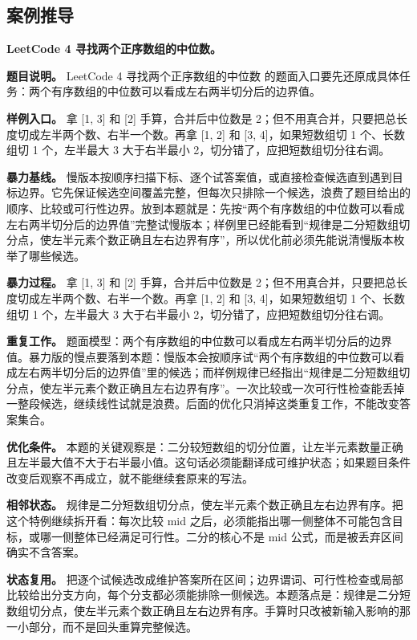 \subsection{案例推导}

\noindent\textbf{LeetCode 4 寻找两个正序数组的中位数。}

\textbf{题目说明。} LeetCode 4 寻找两个正序数组的中位数 的题面入口要先还原成具体任务：两个有序数组的中位数可以看成左右两半切分后的边界值。

\textbf{样例入口。} 拿 [1, 3] 和 [2] 手算，合并后中位数是 2；但不用真合并，只要把总长度切成左半两个数、右半一个数。再拿 [1, 2] 和 [3, 4]，如果短数组切 1 个、长数组切 1 个，左半最大 3 大于右半最小 2，切分错了，应把短数组切分往右调。

\textbf{暴力基线。} 慢版本按顺序扫描下标、逐个试答案值，或直接检查候选直到遇到目标边界。它先保证候选空间覆盖完整，但每次只排除一个候选，浪费了题目给出的顺序、比较或可行性边界。放到本题就是：先按“两个有序数组的中位数可以看成左右两半切分后的边界值”完整试慢版本；样例里已经能看到“规律是二分短数组切分点，使左半元素个数正确且左右边界有序”，所以优化前必须先能说清慢版本枚举了哪些候选。

\textbf{暴力过程。} 拿 [1, 3] 和 [2] 手算，合并后中位数是 2；但不用真合并，只要把总长度切成左半两个数、右半一个数。再拿 [1, 2] 和 [3, 4]，如果短数组切 1 个、长数组切 1 个，左半最大 3 大于右半最小 2，切分错了，应把短数组切分往右调。

\textbf{重复工作。} 题面模型：两个有序数组的中位数可以看成左右两半切分后的边界值。暴力版的慢点要落到本题：慢版本会按顺序试“两个有序数组的中位数可以看成左右两半切分后的边界值”里的候选；而样例规律已经指出“规律是二分短数组切分点，使左半元素个数正确且左右边界有序”。一次比较或一次可行性检查能丢掉一整段候选，继续线性试就是浪费。后面的优化只消掉这类重复工作，不能改变答案集合。

\textbf{优化条件。} 本题的关键观察是：二分较短数组的切分位置，让左半元素数量正确且左半最大值不大于右半最小值。这句话必须能翻译成可维护状态；如果题目条件改变后观察不再成立，就不能继续套原来的写法。

\textbf{相邻状态。} 规律是二分短数组切分点，使左半元素个数正确且左右边界有序。把这个特例继续拆开看：每次比较 mid 之后，必须能指出哪一侧整体不可能包含目标，或哪一侧整体已经满足可行性。二分的核心不是 mid 公式，而是被丢弃区间确实不含答案。

\textbf{状态复用。} 把逐个试候选改成维护答案所在区间；边界谓词、可行性检查或局部比较给出分支方向，每个分支都必须能排除一侧候选。本题落点是：规律是二分短数组切分点，使左半元素个数正确且左右边界有序。手算时只改被新输入影响的那一小部分，而不是回头重算完整候选。

